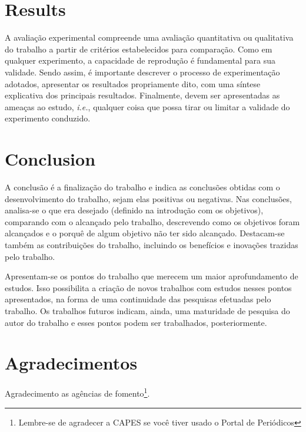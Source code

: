\documentclass[12pt]{article}
\begin{document}
	\section{Results}
	\label{sec_aval_exp}
	
	A avaliação experimental compreende uma avaliação quantitativa ou qualitativa do trabalho a partir de critérios estabelecidos para comparação. Como em qualquer experimento, a capacidade de reprodução é fundamental para sua validade. Sendo assim, é importante descrever o processo de experimentação adotados, apresentar os resultados propriamente dito, com uma síntese explicativa dos principais resultados. Finalmente, devem ser apresentadas as ameaças ao estudo, \emph{i.e.}, qualquer coisa que possa tirar ou limitar a validade do experimento conduzido. 
	
	\section{Conclusion}
	\label{sec_conclusao}
	
	A conclusão é a finalização do trabalho e indica as conclusões obtidas com o desenvolvimento do trabalho, sejam elas positivas ou negativas. Nas conclusões, analisa-se o que era desejado (definido na introdução com os objetivos), comparando com o alcançado pelo trabalho, descrevendo como os objetivos foram alcançados e o porquê de algum objetivo não ter sido alcançado. Destacam-se também as contribuições do trabalho, incluindo os benefícios e inovações trazidas pelo trabalho.
	
	Apresentam-se os pontos do trabalho que merecem um maior aprofundamento de estudos. Isso possibilita a criação de novos trabalhos com estudos nesses pontos apresentados, na forma de uma continuidade das pesquisas efetuadas pelo trabalho. Os trabalhos futuros indicam, ainda, uma maturidade de pesquisa do autor do trabalho e esses pontos podem ser trabalhados, posteriormente.
	
	\section*{Agradecimentos}
	Agradecimento as agências de fomento\footnote{Lembre-se de agradecer a CAPES se você tiver usado o Portal de Periódicos}.
	
    
	
	
\end{document}
